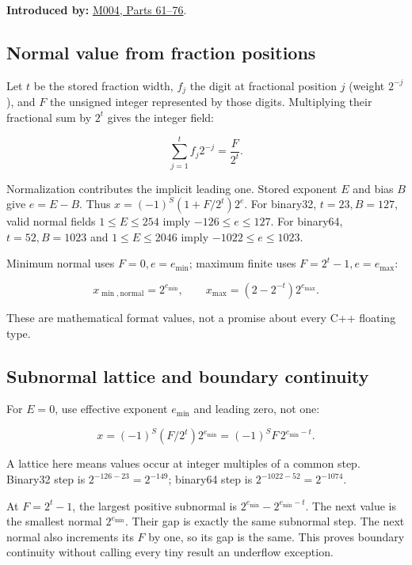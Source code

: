 \textbf{Introduced by:} \hyperref[01-foundations-i-ch001-a-stretching-ruler-for-real-valued-quantities]{M004, Parts 61--76}.

\subsection{Normal value from fraction positions}\label{01-foundations-i-ch011-normal-value-from-fraction-positions}

Let \(t\) be the stored fraction width, \(f_j\) the digit at fractional position \(j\) (weight \(2^{-j}\)), and \(F\) the unsigned integer represented by those digits. Multiplying their fractional sum by \(2^t\) gives the integer field:

\[
\sum_{j=1}^{t}f_j2^{-j}=\frac{F}{2^t}.
\]

Normalization contributes the implicit leading one. Stored exponent \(E\) and bias \(B\) give \(e=E-B\). Thus \(x=(-1)^S(1+F/2^t)2^e\). For binary32, \(t=23,B=127\), valid normal fields \(1\le E\le254\) imply \(-126\le e\le127\). For binary64, \(t=52,B=1023\) and \(1\le E\le2046\) imply \(-1022\le e\le1023\).

Minimum normal uses \(F=0,e=e_{\min}\); maximum finite uses \(F=2^t-1,e=e_{\max}\):

\[
x_{\min,\mathrm{normal}}=2^{e_{\min}},\qquad
x_{\max}=(2-2^{-t})2^{e_{\max}}.
\]

These are mathematical format values, not a promise about every C++ floating type.

\subsection{Subnormal lattice and boundary continuity}\label{01-foundations-i-ch011-subnormal-lattice-and-boundary-continuity}

For \(E=0\), use effective exponent \(e_{\min}\) and leading zero, not one:

\[
x=(-1)^S(F/2^t)2^{e_{\min}}=(-1)^S F\,2^{e_{\min}-t}.
\]

A lattice here means values occur at integer multiples of a common step. Binary32 step is \(2^{-126-23}=2^{-149}\); binary64 step is \(2^{-1022-52}=2^{-1074}\).

At \(F=2^t-1\), the largest positive subnormal is \(2^{e_{\min}}-2^{e_{\min}-t}\). The next value is the smallest normal \(2^{e_{\min}}\). Their gap is exactly the same subnormal step. The next normal also increments its \(F\) by one, so its gap is the same. This proves boundary continuity without calling every tiny result an underflow exception.

